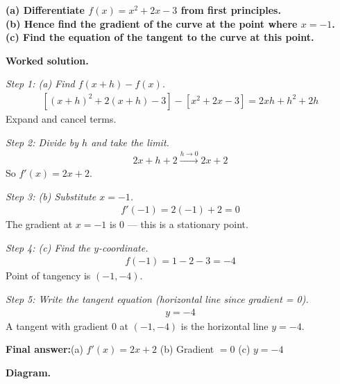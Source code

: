 \documentclass[11pt]{article}
\newcommand{\question}[1]{\par\medskip\noindent\textbf{#1}\par}
\begin{document}
\question{(a) Differentiate \( f(x) = x^2 + 2x - 3 \) from first principles.\\[3pt]  (b) Hence find the gradient of the curve at the point where \( x = -1 \).\\[3pt]  (c) Find the equation of the tangent to the curve at this point.}

\textbf{Worked solution.}

\textit{Step 1: (a) Find \( f(x+h) - f(x) \).}
\[\begin{gathered}
[(x+h)^2 + 2(x+h) - 3] - [x^2 + 2x - 3] = 2xh + h^2 + 2h
\end{gathered}\]
Expand and cancel terms.

\textit{Step 2: Divide by \( h \) and take the limit.}
\[\begin{gathered}
2x + h + 2 \xrightarrow{h \to 0} 2x + 2
\end{gathered}\]
So \( f'(x) = 2x + 2 \).

\textit{Step 3: (b) Substitute \( x = -1 \).}
\[\begin{gathered}
f'(-1) = 2(-1) + 2 = 0
\end{gathered}\]
The gradient at \( x = -1 \) is 0 --- this is a stationary point.

\textit{Step 4: (c) Find the \( y \)-coordinate.}
\[\begin{gathered}
f(-1) = 1 - 2 - 3 = -4
\end{gathered}\]
Point of tangency is \( (-1, -4) \).

\textit{Step 5: Write the tangent equation (horizontal line since gradient = 0).}
\[\begin{gathered}
y = -4
\end{gathered}\]
A tangent with gradient 0 at \( (-1, -4) \) is the horizontal line \( y = -4 \).

\begin{answerbox}
\textbf{Final answer:}\quad (a) \(\displaystyle  f'(x) = 2x + 2 \) \quad  (b) Gradient \(\displaystyle  = 0 \) \quad  (c) \(\displaystyle  y = -4 \)
\end{answerbox}
\textbf{Diagram.}
\end{document}

